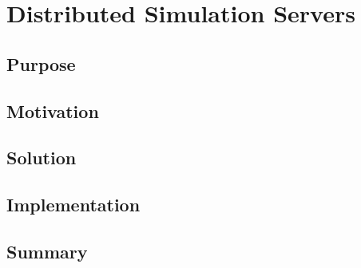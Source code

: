 \chapter{Distributed Simulation Servers}

\section{Purpose}


\section{Motivation}
\subsection{}
\subsection{}
\subsection{}


\section{Solution}
\subsection{}
\subsection{}
\subsection{}


\section{Implementation}
\subsection{}
\subsection{}
\subsection{}


\section{Summary}
